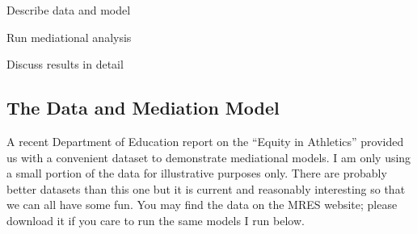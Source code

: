 \documentclass[12pt]{article}
\begin{document}
\begin{enumerate*}
\item Describe data and model
\item Run mediational analysis
\item Discuss results in detail
\end{enumerate*}
\hrulefill

\subsection{The Data and Mediation Model}

A recent Department of Education report on the ``Equity in Athletics''
provided us with a convenient dataset to demonstrate mediational
models.  I am only using a small portion of the data for illustrative
purposes only.  There are probably better datasets than this one but
it is current and reasonably interesting so that we can all have some
fun.  You may find the data on the MRES website; please download it if
you care to run the same models I run below.
\end{document}
